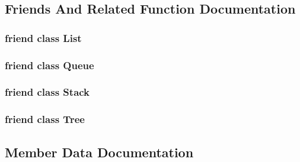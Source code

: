 \subsection{Friends And Related Function Documentation}
\hypertarget{class_benchmark_a8cee552d09eaeb60a09d95309a87b498}{}
\subsubsection[{List}]{\setlength{\rightskip}{0pt plus 5cm}friend class {\bf List}\hspace{0.3cm}{\ttfamily [friend]}}\label{class_benchmark_a8cee552d09eaeb60a09d95309a87b498}
\hypertarget{class_benchmark_a47dfc6f2bc0d50a6e7c92eb00d97b064}{}
\subsubsection[{Queue}]{\setlength{\rightskip}{0pt plus 5cm}friend class {\bf Queue}\hspace{0.3cm}{\ttfamily [friend]}}\label{class_benchmark_a47dfc6f2bc0d50a6e7c92eb00d97b064}
\hypertarget{class_benchmark_a4641b458711966e157e765a8aef3476c}{}
\subsubsection[{Stack}]{\setlength{\rightskip}{0pt plus 5cm}friend class {\bf Stack}\hspace{0.3cm}{\ttfamily [friend]}}\label{class_benchmark_a4641b458711966e157e765a8aef3476c}
\hypertarget{class_benchmark_a4b682814d14447120dd184fd300deade}{}
\subsubsection[{Tree}]{\setlength{\rightskip}{0pt plus 5cm}friend class {\bf Tree}\hspace{0.3cm}{\ttfamily [friend]}}\label{class_benchmark_a4b682814d14447120dd184fd300deade}


\subsection{Member Data Documentation}
\hypertarget{class_benchmark_a5563f218941d6b01ac7783f1e6582025}{}

